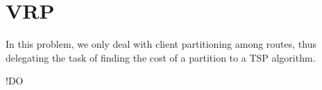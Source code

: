 \section{\texorpdfstring{\Acrlong*{VRP}}{Vehicle routing problem}} \label{algorithm-vrp}
In this problem, we only deal with client partitioning among routes, thus delegating the task of finding the cost of a partition to a \acrshort{TSP} algorithm.\par
!DO



